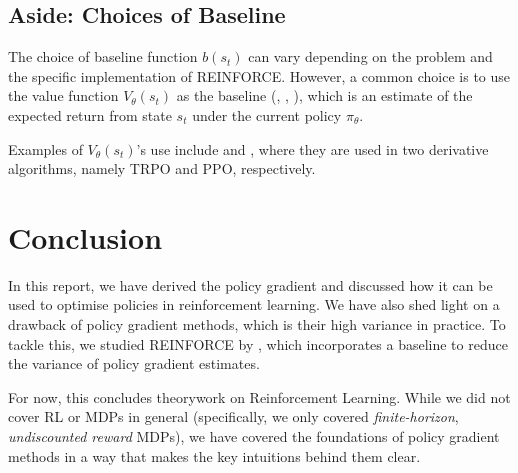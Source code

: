 \documentclass{article} %
\newtheorem{theorem}{Theorem}[section]
\begin{document}
\subsection{Aside: Choices of Baseline}
The choice of baseline function $b(s_t)$ can vary depending on the problem and the specific implementation of REINFORCE.
However, a common choice is to use the value function $V_\theta(s_t)$ as the baseline (\cite{SpinningUp-2018}, \cite{Sutton-and-Barto-1998}, \cite{Weng-2018}), which is an estimate of the expected return from state $s_t$ under the current policy $\pi_\theta$.

Examples of $V_\theta(s_t)$'s use include \cite{Schulman-et-al-2015} and \cite{Schulman-et-al-2017}, where they are used in two derivative algorithms, namely TRPO and PPO, respectively.

\section{Conclusion}
In this report, we have derived the policy gradient and discussed how it can be used to optimise policies in reinforcement learning.
We have also shed light on a drawback of policy gradient methods, which is their high variance in practice.
To tackle this, we studied REINFORCE by \cite{Williams-1992}, which incorporates a baseline to reduce the variance of policy gradient estimates.

For now, this concludes theorywork on Reinforcement Learning. 
While we did not cover RL or MDPs in general (specifically, we only covered \textit{finite-horizon}, \textit{undiscounted reward} MDPs), 
we have covered the foundations of policy gradient methods in a way that makes the key intuitions behind them clear.


\end{document}
